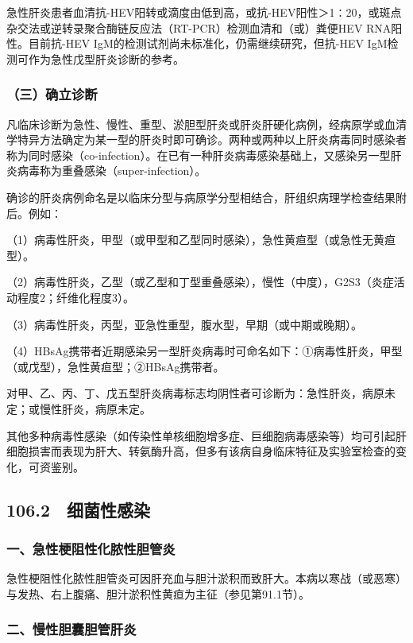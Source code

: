 急性肝炎患者血清抗-HEV阳转或滴度由低到高，或抗-HEV阳性＞1∶20，或斑点杂交法或逆转录聚合酶链反应法（RT-PCR）检测血清和（或）粪便HEV
RNA阳性。目前抗-HEV IgM的检测试剂尚未标准化，仍需继续研究，但抗-HEV
IgM检测可作为急性戊型肝炎诊断的参考。

\subsubsection{（三）确立诊断}

凡临床诊断为急性、慢性、重型、淤胆型肝炎或肝炎肝硬化病例，经病原学或血清学特异方法确定为某一型的肝炎时即可确诊。两种或两种以上肝炎病毒同时感染者称为同时感染（co-infection）。在已有一种肝炎病毒感染基础上，又感染另一型肝炎病毒称为重叠感染（super-infection）。

确诊的肝炎病例命名是以临床分型与病原学分型相结合，肝组织病理学检查结果附后。例如：

（1）病毒性肝炎，甲型（或甲型和乙型同时感染），急性黄疸型（或急性无黄疸型）。

（2）病毒性肝炎，乙型（或乙型和丁型重叠感染），慢性（中度），G2S3（炎症活动程度2；纤维化程度3）。

（3）病毒性肝炎，丙型，亚急性重型，腹水型，早期（或中期或晚期）。

（4）HBsAg携带者近期感染另一型肝炎病毒时可命名如下：①病毒性肝炎，甲型（或戊型），急性黄疸型；②HBsAg携带者。

对甲、乙、丙、丁、戊五型肝炎病毒标志均阴性者可诊断为：急性肝炎，病原未定；或慢性肝炎，病原未定。

其他多种病毒性感染（如传染性单核细胞增多症、巨细胞病毒感染等）均可引起肝细胞损害而表现为肝大、转氨酶升高，但多有该病自身临床特征及实验室检查的变化，可资鉴别。

\protect\hypertarget{text00240.html}{}{}

\subsection{106.2　细菌性感染}

\subsubsection{一、急性梗阻性化脓性胆管炎}

急性梗阻性化脓性胆管炎可因肝充血与胆汁淤积而致肝大。本病以寒战（或恶寒）与发热、右上腹痛、胆汁淤积性黄疸为主征（参见第91.1节）。

\subsubsection{二、慢性胆囊胆管肝炎}

